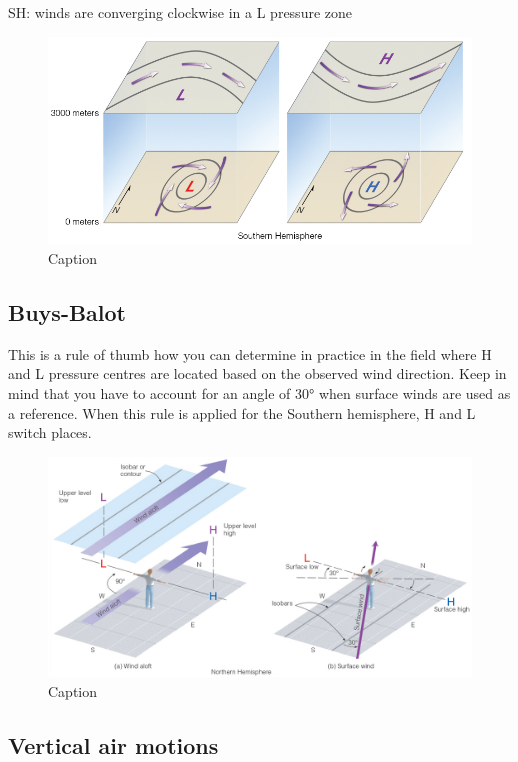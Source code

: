 \documentclass[12pt,oneside]{book}
\begin{document}
SH: winds are converging clockwise in a L pressure zone

\begin{figure}

{\centering \includegraphics[width=0.8\linewidth]{figures/Figure414} 

}

\caption{Caption}\label{fig:ACW}
\end{figure}

\subsection{Buys-Balot}\label{buys-balot}

This is a rule of thumb how you can determine in practice in the field
where H and L pressure centres are located based on the observed wind
direction. Keep in mind that you have to account for an angle of 30°
when surface winds are used as a reference. When this rule is applied
for the Southern hemisphere, H and L switch places.

\begin{figure}

{\centering \includegraphics[width=0.8\linewidth]{figures/Figure415} 

}

\caption{Caption}\label{fig:Buys}
\end{figure}

\subsection{Vertical air motions}\label{vertical-air-motions}
\end{document}
